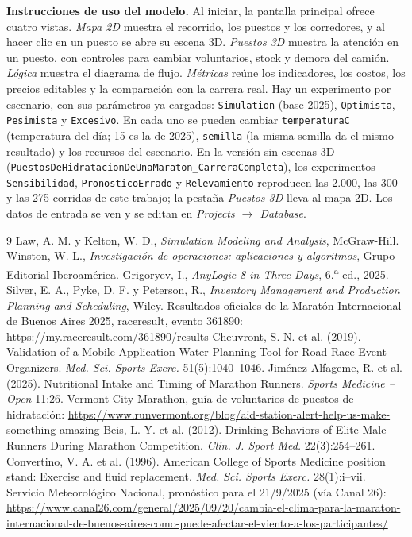 \documentclass[11pt,a4paper]{article}
\begin{document}
\textbf{Instrucciones de uso del modelo.} Al iniciar, la pantalla principal ofrece cuatro vistas. \emph{Mapa 2D} muestra el recorrido, los puestos y los corredores, y al hacer clic en un puesto se abre su escena 3D. \emph{Puestos 3D} muestra la atención en un puesto, con controles para cambiar voluntarios, stock y demora del camión. \emph{Lógica} muestra el diagrama de flujo. \emph{Métricas} reúne los indicadores, los costos, los precios editables y la comparación con la carrera real. Hay un experimento por escenario, con sus parámetros ya cargados: \texttt{Simulation} (base 2025), \texttt{Optimista}, \texttt{Pesimista} y \texttt{Excesivo}. En cada uno se pueden cambiar \texttt{temperaturaC} (temperatura del día; 15 es la de 2025), \texttt{semilla} (la misma semilla da el mismo resultado) y los recursos del escenario. En la versión sin escenas 3D (\texttt{PuestosDeHidratacionDeUnaMaraton\_CarreraCompleta}), los experimentos \texttt{Sensibilidad}, \texttt{PronosticoErrado} y \texttt{Relevamiento} reproducen las 2.000, las 300 y las 275 corridas de este trabajo; la pestaña \emph{Puestos 3D} lleva al mapa 2D. Los datos de entrada se ven y se editan en \emph{Projects $\rightarrow$ Database}.

\begin{thebibliography}{9}
 Law, A. M. y Kelton, W. D., \emph{Simulation Modeling and Analysis}, McGraw-Hill.
 Winston, W. L., \emph{Investigación de operaciones: aplicaciones y algoritmos}, Grupo Editorial Iberoamérica.
 Grigoryev, I., \emph{AnyLogic 8 in Three Days}, 6.\textsuperscript{a} ed., 2025.
 Silver, E. A., Pyke, D. F. y Peterson, R., \emph{Inventory Management and Production Planning and Scheduling}, Wiley.
 Resultados oficiales de la Maratón Internacional de Buenos Aires 2025, raceresult, evento 361890: \url{https://my.raceresult.com/361890/results}
 Cheuvront, S. N. et al. (2019). Validation of a Mobile Application Water Planning Tool for Road Race Event Organizers. \emph{Med. Sci. Sports Exerc.} 51(5):1040--1046.
 Jiménez-Alfageme, R. et al. (2025). Nutritional Intake and Timing of Marathon Runners. \emph{Sports Medicine -- Open} 11:26.
 Vermont City Marathon, guía de voluntarios de puestos de hidratación: \url{https://www.runvermont.org/blog/aid-station-alert-help-us-make-something-amazing}
 Beis, L. Y. et al. (2012). Drinking Behaviors of Elite Male Runners During Marathon Competition. \emph{Clin. J. Sport Med.} 22(3):254--261.
 Convertino, V. A. et al. (1996). American College of Sports Medicine position stand: Exercise and fluid replacement. \emph{Med. Sci. Sports Exerc.} 28(1):i--vii.
 Servicio Meteorológico Nacional, pronóstico para el 21/9/2025 (vía Canal 26): \url{https://www.canal26.com/general/2025/09/20/cambia-el-clima-para-la-maraton-internacional-de-buenos-aires-como-puede-afectar-el-viento-a-los-participantes/}
\end{thebibliography}
\end{document}
